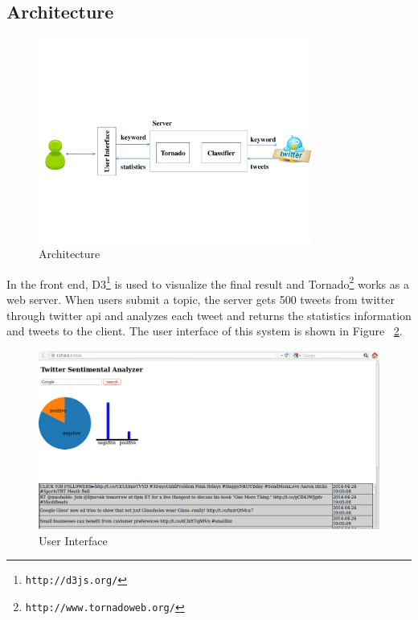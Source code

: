 \documentclass{article}
\begin{document}
\subsection{Architecture}

\begin{figure}
\centering
\includegraphics[width=0.8\textwidth]{pics/architecture.pdf}
\caption{Architecture}
\label{Fig:architecture}
\end{figure}

In the front end, D3\footnote{\texttt{\scriptsize{http://d3js.org/‎‎}}} is used to visualize the final result and Tornado\footnote{\texttt{\scriptsize{http://www.tornadoweb.org/}}} works as a web server. When users submit a topic, the server gets 500 tweets from twitter through twitter api and analyzes each tweet and returns the statistics information and tweets to the client. The user interface of this system is shown in Figure ~\ref{Fig:ui}.

\begin{figure}
\centering
\includegraphics[width=1.0\textwidth]{pics/UI.png}
\caption{User Interface}
\label{Fig:ui}
\end{figure}
\end{document}
